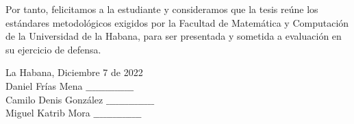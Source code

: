 \begin{opinion}
Por tanto, felicitamos a la estudiante y consideramos que la tesis reúne los estándares metodológicos exigidos por la Facultad de Matemática y Computación de la Universidad de la Habana, para ser presentada y sometida a evaluación en su ejercicio de defensa.

La Habana, Diciembre 7 de 2022\\

Daniel Frías Mena $\_\_\_\_\_\_\_\_\_\_\_\_\_\_\_$\\

Camilo Denis González $\_\_\_\_\_\_\_\_\_\_\_\_\_\_\_$\\

Miguel Katrib Mora $\_\_\_\_\_\_\_\_\_\_\_\_\_\_\_$\\

\end{opinion}